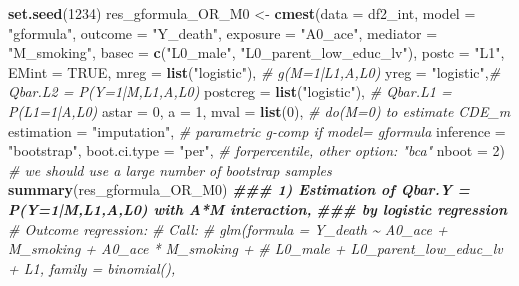 \documentclass[
]{book}
\newenvironment{Shaded}{\begin{snugshade}}{\end{snugshade}}
\newcommand{\AttributeTok}[1]{\textcolor[rgb]{0.13,0.29,0.53}{#1}}
\newcommand{\CommentTok}[1]{\textcolor[rgb]{0.56,0.35,0.01}{\textit{#1}}}
\newcommand{\ConstantTok}[1]{\textcolor[rgb]{0.56,0.35,0.01}{#1}}
\newcommand{\DecValTok}[1]{\textcolor[rgb]{0.00,0.00,0.81}{#1}}
\newcommand{\DocumentationTok}[1]{\textcolor[rgb]{0.56,0.35,0.01}{\textbf{\textit{#1}}}}
\newcommand{\FunctionTok}[1]{\textcolor[rgb]{0.13,0.29,0.53}{\textbf{#1}}}
\newcommand{\NormalTok}[1]{#1}
\newcommand{\OtherTok}[1]{\textcolor[rgb]{0.56,0.35,0.01}{#1}}
\newcommand{\StringTok}[1]{\textcolor[rgb]{0.31,0.60,0.02}{#1}}
\begin{document}
\begin{Shaded}
\begin{Highlighting}[]
\FunctionTok{set.seed}\NormalTok{(}\DecValTok{1234}\NormalTok{)}
\NormalTok{res\_gformula\_OR\_M0 }\OtherTok{\textless{}{-}} \FunctionTok{cmest}\NormalTok{(}\AttributeTok{data =}\NormalTok{ df2\_int,}
                      \AttributeTok{model =} \StringTok{"gformula"}\NormalTok{,}
                      \AttributeTok{outcome =} \StringTok{"Y\_death"}\NormalTok{,}
                      \AttributeTok{exposure =} \StringTok{"A0\_ace"}\NormalTok{,}
                      \AttributeTok{mediator =} \StringTok{"M\_smoking"}\NormalTok{,}
                      \AttributeTok{basec =} \FunctionTok{c}\NormalTok{(}\StringTok{"L0\_male"}\NormalTok{, }\StringTok{"L0\_parent\_low\_educ\_lv"}\NormalTok{),}
                      \AttributeTok{postc =} \StringTok{"L1"}\NormalTok{,}
                      \AttributeTok{EMint =} \ConstantTok{TRUE}\NormalTok{,}
                      \AttributeTok{mreg =} \FunctionTok{list}\NormalTok{(}\StringTok{"logistic"}\NormalTok{), }\CommentTok{\# g(M=1|L1,A,L0)}
                      \AttributeTok{yreg =} \StringTok{"logistic"}\NormalTok{,}\CommentTok{\# Qbar.L2 = P(Y=1|M,L1,A,L0)}
                      \AttributeTok{postcreg =} \FunctionTok{list}\NormalTok{(}\StringTok{"logistic"}\NormalTok{), }\CommentTok{\# Qbar.L1 = P(L1=1|A,L0)}
                      \AttributeTok{astar =} \DecValTok{0}\NormalTok{,}
                      \AttributeTok{a =} \DecValTok{1}\NormalTok{,}
                      \AttributeTok{mval =} \FunctionTok{list}\NormalTok{(}\DecValTok{0}\NormalTok{), }\CommentTok{\# do(M=0) to estimate CDE\_m}
                      \AttributeTok{estimation =} \StringTok{"imputation"}\NormalTok{, }\CommentTok{\# parametric g{-}comp if model= gformula}
                      \AttributeTok{inference =} \StringTok{"bootstrap"}\NormalTok{,}
                      \AttributeTok{boot.ci.type =} \StringTok{"per"}\NormalTok{, }\CommentTok{\# forpercentile, other option: "bca"}
                      \AttributeTok{nboot =} \DecValTok{2}\NormalTok{) }\CommentTok{\# we should use a large number of bootstrap samples}
\FunctionTok{summary}\NormalTok{(res\_gformula\_OR\_M0)}
\DocumentationTok{\#\#\# 1) Estimation of Qbar.Y = P(Y=1|M,L1,A,L0) with A*M interaction,}
\DocumentationTok{\#\#\#    by logistic regression}
\CommentTok{\# Outcome regression:}
\CommentTok{\# Call:}
\CommentTok{\# glm(formula = Y\_death \textasciitilde{} A0\_ace + M\_smoking + A0\_ace * M\_smoking + }
\CommentTok{\#     L0\_male + L0\_parent\_low\_educ\_lv + L1, family = binomial(), }

\end{Highlighting}
\end{Shaded}
\end{document}
